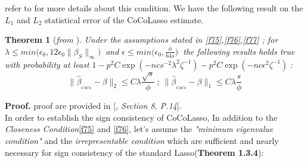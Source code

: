 \documentclass[12pt]{report}
\newtheorem{theoreme}{Theorem}[section] %
\begin{document}
refer to \cite{nref22} for more details about this condition. We have the following result on the $L_{1}$ and $L_{2}$ statistical error of the CoCoLasso estimate.
\begin{theoreme}[\textit{from \cite{nref18}}]
	Under the assumptions stated in \eqref{f75},\eqref{f76},\eqref{f77} ; for $\lambda \leq min\big(\epsilon_{0},12\epsilon_{0}\parallel \beta_{S}\parallel_{\infty}\big)\ $ and $\epsilon\leq min\big(\epsilon_{0},\frac{\phi}{64s}\big)\ $ the following results holds true with probability at least $1-p^{2}C\exp(-ncs^{-2}\lambda^{2}\zeta^{-1})-p^{2}C\exp(-nc\epsilon^{2}\zeta^{-1})\ $:
	\begin{equation}
		\parallel \hat{\beta}_{_{CoCo}}-\beta \parallel_{2}\leq C\lambda\frac{\sqrt{s}}{\phi}\ ;\ \parallel \hat{\beta}_{_{CoCo}}-\beta \parallel_{1}\leq C\lambda\frac{s}{\phi}
	\end{equation}
\end{theoreme}
\textbf{Proof.} proof are provided in [\textit{\cite{nref18}, Section 8, P.14}].\\
In order to establish the sign consistency of CoCoLasso, In addition to the \textit{Closeness Condition}\eqref{f75} and \eqref{f76}, let's assume the \textit{ "minimum eigenvalue condition"} and the \textit{irrepresentable condition} which are sufficient and nearly necessary for sign consistency of the standard Lasso(\textbf{Theorem 1.3.4}):
\end{document}
